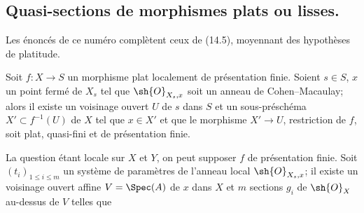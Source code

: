\subsection{Quasi-sections de morphismes plats ou lisses.}

Les énoncés de ce numéro complètent ceux de (14.5), moyennant des hypothèses de platitude.

\begin{proposition}[17.16.1]
\label{IV.17.16.1}
Soit $f:X\to S$ un morphisme plat localement de présentation finie. Soient $s\in S$, $x$ un point fermé de $X_s$ tel que $\sh{O}_{X_s,x}$ soit un anneau de Cohen--Macaulay; alors il existe un voisinage ouvert $U$ de $s$ dans $S$ et un sous-préschéma $X'\subset f^{-1}(U)$ de $X$ tel que $x\in X'$ et que le morphisme $X'\to U$, restriction de $f$, soit plat, quasi-fini et de présentation finie.
\end{proposition}

La question étant locale sur $X$ et $Y$, on peut supposer $f$ de présentation finie. Soit $(t_i)_{1\leq i\leq m}$ un système de paramètres de l'anneau local $\sh{O}_{X_s,x}$; il existe un voisinage ouvert affine $V=\Spec(A)$ de $x$ dans $X$ et $m$ sections $g_i$ de $\sh{O}_X$ au-dessus de $V$ telles que

